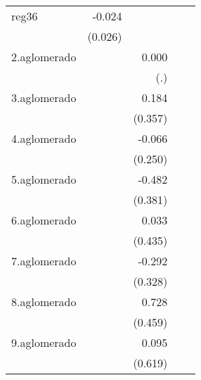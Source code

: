 {\begin{longtable}{l*{4}{D{.}{.}{-1}}}
\addlinespace
reg36       &      -0.024         &                     &                     &                     \\
            &     (0.026)         &                     &                     &                     \\
\addlinespace
2.aglomerado&                     &       0.000         &                     &                     \\
            &                     &         (.)         &                     &                     \\
\addlinespace
3.aglomerado&                     &       0.184         &                     &                     \\
            &                     &     (0.357)         &                     &                     \\
\addlinespace
4.aglomerado&                     &      -0.066         &                     &                     \\
            &                     &     (0.250)         &                     &                     \\
\addlinespace
5.aglomerado&                     &      -0.482         &                     &                     \\
            &                     &     (0.381)         &                     &                     \\
\addlinespace
6.aglomerado&                     &       0.033         &                     &                     \\
            &                     &     (0.435)         &                     &                     \\
\addlinespace
7.aglomerado&                     &      -0.292         &                     &                     \\
            &                     &     (0.328)         &                     &                     \\
\addlinespace
8.aglomerado&                     &       0.728         &                     &                     \\
            &                     &     (0.459)         &                     &                     \\
\addlinespace
9.aglomerado&                     &       0.095         &                     &                     \\
            &                     &     (0.619)         &                     &                     \\

\end{longtable}}
